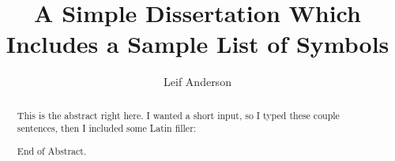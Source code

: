 \documentclass{csuthesis} %
\title{A Simple Dissertation Which Includes a Sample List of Symbols}
\author{Leif Anderson}
\begin{document}
\frontmatter

% 
\begin{abstract}
This is the abstract right here. I wanted a short input, so I typed these couple sentences, then I included some Latin filler: \lipsum[1-4]

End of Abstract.
\end{abstract}

\maketitle


\tableofcontents %
\listoftables %
\end{document}
